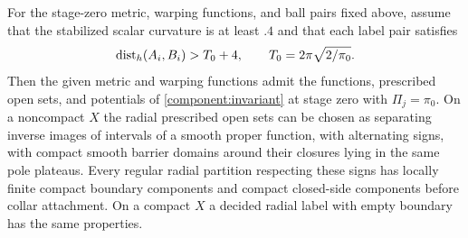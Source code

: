 \begin{lemma}\label{component:initialization}
For the stage-zero metric, warping functions, and ball pairs fixed above, assume
that the stabilized scalar curvature is at least $.4$ and that each
label pair satisfies
\[
 \operatorname{dist}_h(A_i,B_i)>T_0+4,\qquad
 T_0=2\pi\sqrt{2/\pi_0}.
\]
Then the given metric and warping functions admit the functions, prescribed open sets, and
potentials of \cref{component:invariant} at stage zero with
$\Pi_j=\pi_0$.  On a noncompact $X$ the radial prescribed open sets can be chosen
as separating inverse images of intervals of a smooth proper function,
with alternating signs,
with compact smooth barrier domains around their closures lying in
the same pole plateaus.  Every regular radial partition respecting
these signs has locally finite compact boundary components and compact
closed-side components before collar attachment.  On a compact $X$
a decided radial label with empty boundary has the same properties.
\end{lemma}


